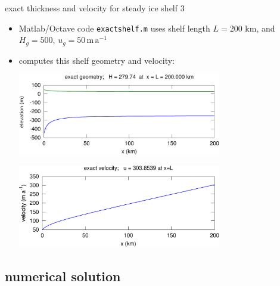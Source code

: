 \begin{frame}{exact thickness and velocity for steady ice shelf 3}

\small
\begin{itemize}
\item Matlab/Octave code \texttt{exactshelf.m} uses shelf length $L=200$ km, and $H_g=500$, $u_g = 50\,\text{m}\,\text{a}^{-1}$
\item computes this shelf geometry and velocity:
  \begin{center}
  \includegraphics[width=0.7\textwidth]{photos/shelfthk}

  \smallskip
  \includegraphics[width=0.7\textwidth]{photos/shelfvel}
  \end{center}
\end{itemize}
\end{frame}


\subsection{numerical solution}


